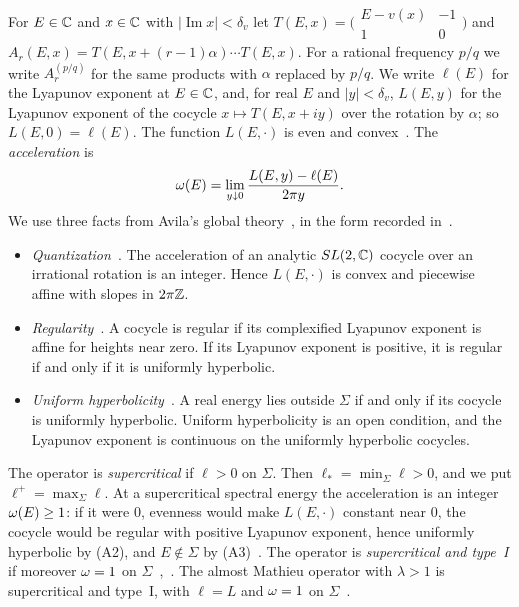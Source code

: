 For $E\in\mathbb C$ and $x\in\mathbb C$ with $|\operatorname{Im}x|<\delta_v$ let $T(E,x)=\bigl(\begin{smallmatrix}E-v(x)&-1\\1&0\end{smallmatrix}\bigr)$ and $A_r(E,x)=T(E,x+(r-1)\alpha)\cdots T(E,x)$. For a rational frequency $p/q$ we write $A^{(p/q)}_r$ for the same products with $\alpha$ replaced by $p/q$. We write $\ell(E)$ for the Lyapunov exponent at $E\in\mathbb C$, and, for real $E$ and $|y|<\delta_v$, $L(E,y)$ for the Lyapunov exponent of the cocycle $x\mapsto T(E,x+iy)$ over the rotation by $\alpha$; so $L(E,0)=\ell(E)$. The function $L(E,\cdot)$ is even and convex~\cite[Section~2.1]{Avila2015}. The \emph{acceleration} is
\[
\omega(E)=\lim_{y\downarrow0}\frac{L(E,y)-\ell(E)}{2\pi y}.
\]
We use three facts from Avila's global theory~\cite{Avila2015}, in the form recorded in~\cite[Section~5.1]{DMuniv}.
\begin{itemize}
\item[(A1)] \emph{Quantization}~\cite[Theorem~5]{Avila2015}. The acceleration of an analytic $SL(2,\mathbb C)$ cocycle over an irrational rotation is an integer. Hence $L(E,\cdot)$ is convex and piecewise affine with slopes in $2\pi\mathbb Z$.
\item[(A2)] \emph{Regularity}~\cite[Definition~3 and Theorem~6]{Avila2015}. A cocycle is regular if its complexified Lyapunov exponent is affine for heights near zero. If its Lyapunov exponent is positive, it is regular if and only if it is uniformly hyperbolic.
\item[(A3)] \emph{Uniform hyperbolicity}~\cite[Section~2.1]{Avila2015}. A real energy lies outside $\Sigma$ if and only if its cocycle is uniformly hyperbolic. Uniform hyperbolicity is an open condition, and the Lyapunov exponent is continuous on the uniformly hyperbolic cocycles.
\end{itemize}
The operator is \emph{supercritical} if $\ell>0$ on $\Sigma$. Then $\ell_*=\min_\Sigma\ell>0$, and we put $\ell^+=\max_\Sigma\ell$. At a supercritical spectral energy the acceleration is an integer $\omega(E)\ge1$: if it were $0$, evenness would make $L(E,\cdot)$ constant near $0$, the cocycle would be regular with positive Lyapunov exponent, hence uniformly hyperbolic by (A2), and $E\notin\Sigma$ by (A3)~\cite[proof of Lemma~5.2]{DMuniv}. The operator is \emph{supercritical and type~I} if moreover $\omega=1$ on $\Sigma$~\cite[Definition~2.1]{GeJitomirskaya2024},~\cite[Definition~5.1]{DMuniv}. The almost Mathieu operator with $\lambda>1$ is supercritical and type~I, with $\ell=L$ and $\omega=1$ on $\Sigma$~\cite[Section~5.1]{DMuniv}.

